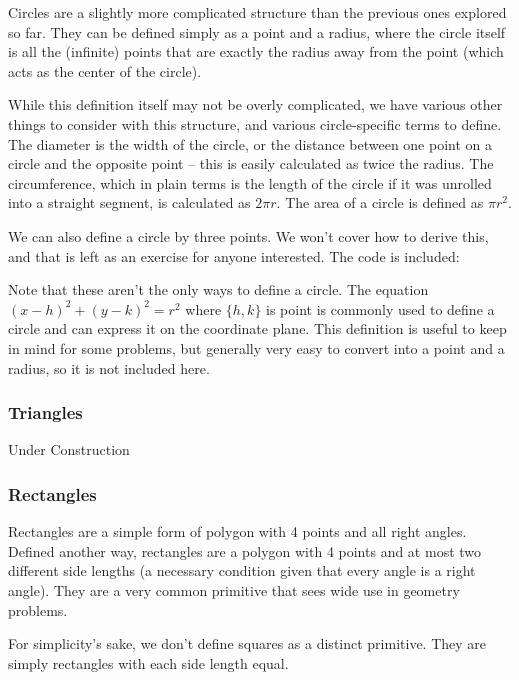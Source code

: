 Circles are a slightly more complicated structure than the previous ones explored so far. They can be defined simply as a point and a radius, where the circle itself is all the (infinite) points that are exactly the radius away from the point (which acts as the center of the circle).

While this definition itself may not be overly complicated, we have various other things to consider with this structure, and various circle-specific terms to define. The diameter is the width of the circle, or the distance between one point on a circle and the opposite point -- this is easily calculated as twice the radius. The circumference, which in plain terms is the length of the circle if it was unrolled into a straight segment, is calculated as $2 \pi r$. The area of a circle is defined as $\pi r^2$.

We can also define a circle by three points. We won't cover how to derive this, and that is left as an exercise for anyone interested. The code is included:


Note that these aren't the only ways to define a circle. The equation $(x-h)^2 + (y-k)^2 = r^2$ where $\{h,k\}$ is point is commonly used to define a circle and can express it on the coordinate plane. This definition is useful to keep in mind for some problems, but generally very easy to convert into a point and a radius, so it is not included here.

\subsubsection{Triangles}

Under Construction

\subsubsection{Rectangles}
 

Rectangles are a simple form of polygon with 4 points and all right angles. Defined another way, rectangles are a polygon with 4 points and at most two different side lengths (a necessary condition given that every angle is a right angle). They are a very common primitive that sees wide use in geometry problems.

For simplicity's sake, we don't define squares as a distinct primitive. They are simply rectangles with each side length equal.

